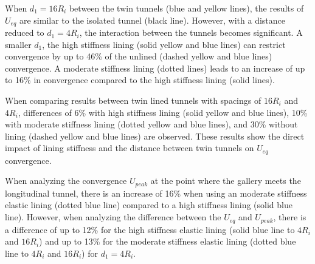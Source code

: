\documentclass[a4paper,fleqn]{cas-sc}
\begin{document}
When $d_1 = 16R_i$ between the twin tunnels (blue and yellow lines), the results of $U_{eq}$ are similar to the isolated tunnel (black line). However, with a distance reduced to $d_1 = 4R_i$, the interaction between the tunnels becomes significant. A smaller $d_1$, the high stiffness lining (solid yellow and blue lines) can restrict convergence by up to 46\% of the unlined (dashed yellow and blue lines) convergence. A moderate stiffness lining (dotted lines) leads to an increase of up to 16\% in convergence compared to the high stiffness lining (solid lines).

When comparing results between twin lined tunnels with spacings of $16R_i$ and $4R_i$, differences of 6\% with high stiffness lining (solid yellow and blue lines), 10\% with moderate stiffness lining (dotted yellow and blue lines), and 30\% without lining (dashed yellow and blue lines) are observed. These results show the direct impact of lining stiffness and the distance between twin tunnels on $U_{eq}$ convergence.

When analyzing the convergence $U_{peak}$ at the point where the gallery meets the longitudinal tunnel, there is an increase of 16\% when using an moderate stiffness elastic lining (dotted blue line) compared to a high stiffness lining (solid blue line). However, when analyzing the difference between the $U_{eq}$ and $U_{peak}$, there is a difference of up to 12\% for the high stiffness elastic lining (solid blue line to $4R_i$ and $16R_i$) and up to 13\% for the moderate stiffness elastic lining (dotted blue line to $4R_i$ and $16R_i$) for $d_1=4R_i$.
\end{document}
